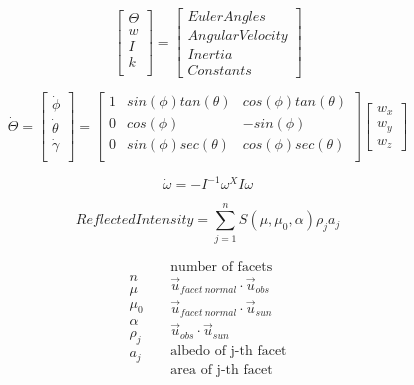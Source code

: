 \documentclass{article}
\begin{document}
\begin{equation}
	\begin{bmatrix} \Theta \\  w \\  I \\ k\\
	\end{bmatrix}
	=
	\begin{bmatrix}
	Euler Angles \\ Angular Velocity \\ Inertia \\ Constants
	\end{bmatrix}
\end{equation}

\begin{equation}
	\dot{\Theta} =
	\begin{bmatrix}
	\dot{\phi} \\ \dot{\theta} \\ \dot{\gamma} \\
	\end{bmatrix}
	=
	\begin{bmatrix}
	1 & sin(\phi)tan(\theta) & cos(\phi)tan(\theta) \\
	0 & cos(\phi) & -sin(\phi) \\
	0 & sin(\phi)sec(\theta) & cos(\phi)sec(\theta) \\
	\end{bmatrix}
	\begin{bmatrix}
	w_{x} \\ w_{y} \\ w_{z}
	\end{bmatrix}
\end{equation}

\begin{equation}
\dot{\omega} = -I^{-1}\omega^{X}I\omega
\end{equation}

\begin{equation}
	Reflected Intensity = 
	\sum_{j = 1}^{n} S(\mu, \mu_{0}, \alpha) \rho_{j} a_{j}
\end{equation}

\begin{equation}
	\begin{matrix}
	n \\ \mu \\ \mu_{0} \\ \alpha \\ \rho_{j} \\ a_{j} \\
	\end{matrix}
	\;\;\;\;
	\begin{matrix}
	\text{number of facets} \\
	\vec{u}_{facet\:normal}\cdotp\vec{u}_{obs} \\
	\vec{u}_{facet\:normal}\cdotp\vec{u}_{sun} \\
	\vec{u}_{obs}\cdotp\vec{u}_{sun} \\
	\text{albedo of j-th facet} \\
	\text{area of j-th facet}\\
	\end{matrix}
\end{equation}
\end{document}
